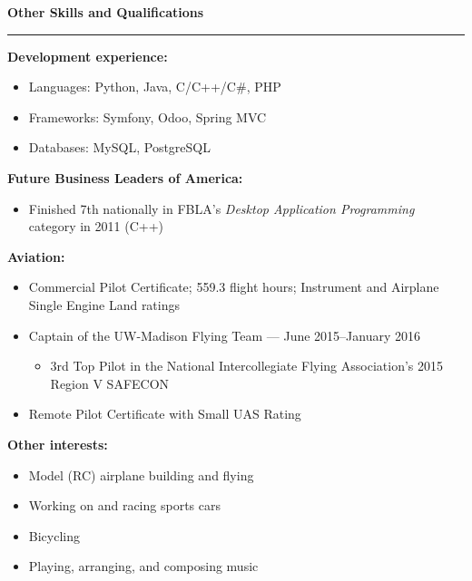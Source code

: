 \documentclass[12pt,letterpaper]{article}
\newenvironment{details}{
    \vspace{-.8em}
    \begin{itemize}
        \renewcommand \labelitemi{\labelitemiv}
        \setlength{\itemsep}{0pt}
        \setlength{\parskip}{-1pt}
        \setlength{\parsep}{0pt}
    }{
    \end{itemize}
    \vspace{-.5em}
}
\newcommand{\hr} {
    \vspace{-1em}
    \par\rule{\textwidth}{1pt}
    \vspace{-1.5em}
}
\newcommand{\ressection}[1] {
    \par{\large \textbf{#1}}
    \hr
}
\newenvironment{other} {
    \ressection{Other Skills and Qualifications}
    \setlength{\parskip}{3pt}
}{
    \vspace{0.5em}
}
\begin{document}
\begin{other}
\par \textbf{Development experience:}
\vspace{1pt}
\begin{details}
    \item Languages: Python, Java, C/C++/C\#, PHP
    \item Frameworks: Symfony, Odoo, Spring MVC
    \item Databases: MySQL, PostgreSQL
\end{details}
\par \textbf{Future Business Leaders of America:}
\vspace{1pt}
\begin{details}
    \item Finished 7th nationally in FBLA's \textit{Desktop Application Programming} category in 2011 (C++)
\end{details}

\par \textbf{Aviation:}
\vspace{1pt}
\begin{details}
    \item Commercial Pilot Certificate; 559.3 flight hours; Instrument and Airplane Single Engine Land ratings
    \item Captain of the UW-Madison Flying Team --- June 2015--January 2016
    \vspace{.5em}
    \begin{details}
        \item 3rd Top Pilot in the National Intercollegiate Flying Association's 2015 Region V SAFECON
    \end{details}
    \item Remote Pilot Certificate with Small UAS Rating
\end{details}

\par \textbf{Other interests:}
\vspace{1pt}
\begin{details}
    \item Model (RC) airplane building and flying
    \item Working on and racing sports cars
    \item Bicycling
    \item Playing, arranging, and composing music
\end{details}

\end{other}
\end{document}
